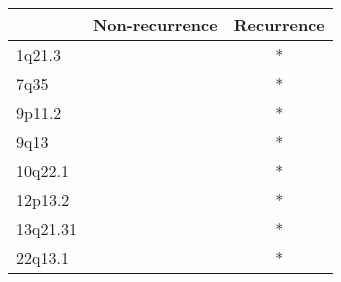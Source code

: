 \begin{tabular}{lcc}
\toprule
{} & Non-recurrence & Recurrence \\
\midrule
1q21.3   &                &          * \\
7q35     &                &          * \\
9p11.2   &                &          * \\
9q13     &                &          * \\
10q22.1  &                &          * \\
12p13.2  &                &          * \\
13q21.31 &                &          * \\
22q13.1  &                &          * \\
\bottomrule
\end{tabular}
